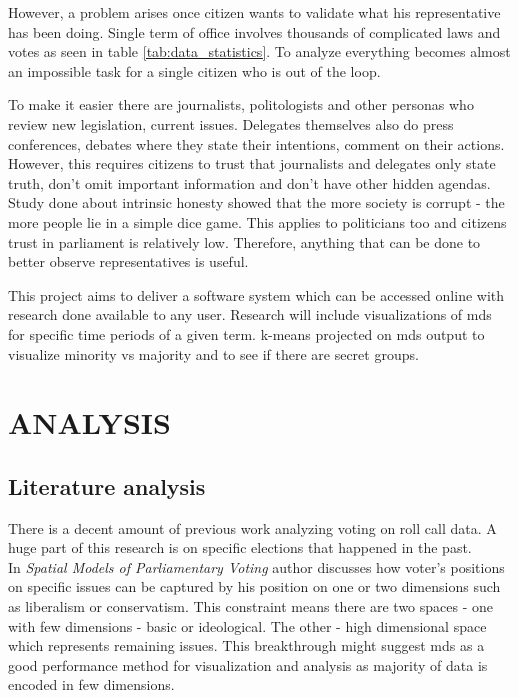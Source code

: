 \documentclass[a4paper,12pt]{article}
\begin{document}
	However, a problem arises once citizen wants to validate what his representative has been doing. Single term of office involves thousands of complicated laws and votes as seen in table \ref{tab:data_statistics}. To analyze everything becomes almost an impossible task for a single citizen who is out of the loop. 
	
	To make it easier there are journalists, politologists and other personas who review new legislation, current issues. Delegates themselves also do press conferences, debates where they state their intentions, comment on their actions. However, this requires citizens to trust that journalists and delegates only state truth, don't omit important information and don't have other hidden agendas. Study done about intrinsic honesty showed that the more society is corrupt - the more people lie in a simple dice game. This applies to politicians too and citizens trust in parliament is relatively low.  Therefore, anything that can be done to better observe representatives is useful.

	This project aims to deliver a software system which can be accessed online with research done available to any user. Research will include visualizations of \acrfull{mds} for specific time periods of a given term. \Gls{k-means} projected on \gls{mds} output to visualize minority vs majority and to see if there are secret groups.
    
    \clearpage
    
    \section{ANALYSIS}
   
   	\subsection{Literature analysis}
   	
	There is a decent amount of previous work analyzing voting on roll call data. A huge part of this research is on specific elections that happened in the past.\\	
	
	In \textit{Spatial Models of Parliamentary Voting} \cite{poole_2005} author discusses how voter's positions on specific issues can be captured by his position on one or two dimensions such as liberalism or conservatism. This constraint means there are two spaces - one with few dimensions - basic  or ideological. The other - high dimensional space which represents remaining issues. This breakthrough might suggest \acrlong{mds} as a good performance method for visualization and analysis as majority of data is encoded in few dimensions.\\
	
\end{document}
